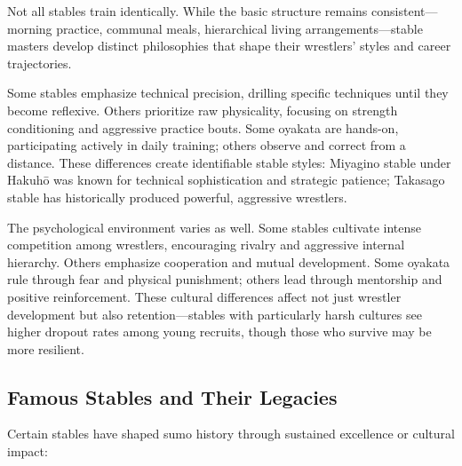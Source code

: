 Not all stables train identically. While the basic structure remains consistent—morning practice, communal meals, hierarchical living arrangements—stable masters develop distinct philosophies that shape their wrestlers' styles and career trajectories.

Some stables emphasize technical precision, drilling specific techniques until they become reflexive. Others prioritize raw physicality, focusing on strength conditioning and aggressive practice bouts. Some oyakata are hands-on, participating actively in daily training; others observe and correct from a distance. These differences create identifiable stable styles: Miyagino stable under Hakuhō was known for technical sophistication and strategic patience; Takasago stable has historically produced powerful, aggressive wrestlers.

The psychological environment varies as well. Some stables cultivate intense competition among wrestlers, encouraging rivalry and aggressive internal hierarchy. Others emphasize cooperation and mutual development. Some oyakata rule through fear and physical punishment; others lead through mentorship and positive reinforcement. These cultural differences affect not just wrestler development but also retention—stables with particularly harsh cultures see higher dropout rates among young recruits, though those who survive may be more resilient.

\subsection{Famous Stables and Their Legacies}

Certain stables have shaped sumo history through sustained excellence or cultural impact:

